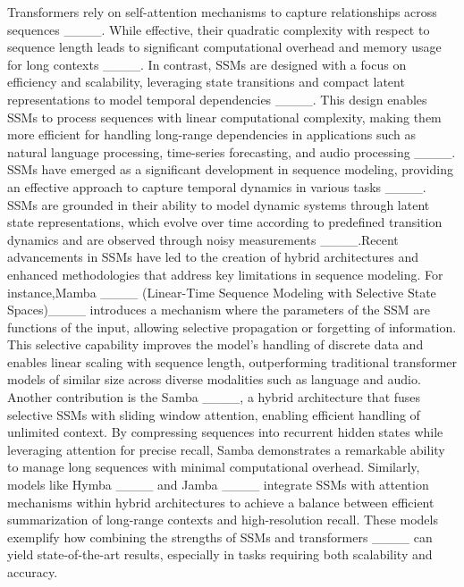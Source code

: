 Transformers rely on self-attention mechanisms to capture relationships across sequences ____. While effective, their quadratic complexity with respect to sequence length leads to significant computational overhead and memory usage for long contexts ____. In contrast, SSMs are designed with a focus on efficiency and scalability, leveraging state transitions and compact latent representations to model temporal dependencies ____. This design enables SSMs to process sequences with linear computational complexity, making them more efficient for handling long-range dependencies in applications such as natural language processing, time-series forecasting, and audio processing ____. SSMs have emerged as a significant development in sequence modeling, providing an effective approach to capture temporal dynamics in various tasks ____. SSMs are grounded in their ability to model dynamic systems through latent state representations, which evolve over time according to predefined transition dynamics and are observed through noisy measurements ____.Recent advancements in SSMs have led to the creation of hybrid architectures and enhanced methodologies that address key limitations in sequence modeling. For instance,Mamba ____ (Linear-Time Sequence Modeling with Selective State Spaces)____ introduces a mechanism where the parameters of the SSM are functions of the input, allowing selective propagation or forgetting of information. This selective capability improves the model's handling of discrete data and enables linear scaling with sequence length, outperforming traditional transformer models of similar size across diverse modalities such as language and audio. Another contribution is the Samba ____,  a hybrid architecture that fuses selective SSMs with sliding window attention, enabling efficient handling of unlimited context. By compressing sequences into recurrent hidden states while leveraging attention for precise recall, Samba demonstrates a remarkable ability to manage long sequences with minimal computational overhead. Similarly, models like Hymba ____ and Jamba ____ integrate SSMs with attention mechanisms within hybrid architectures to achieve a balance between efficient summarization of long-range contexts and high-resolution recall. These models exemplify how combining the strengths of SSMs and transformers ____ can yield state-of-the-art results, especially in tasks requiring both scalability and accuracy.
